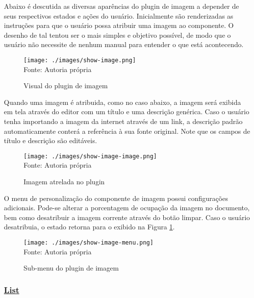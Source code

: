 
Abaixo é descutida as diversas aparências do plugin de imagem
a depender de seus respectivos estados e ações do usuário.
Inicialmente são renderizadas as instruções para que o usuário possa
atribuir uma imagem ao componente. O desenho de tal tentou ser o mais
simples e objetivo possível, de modo que o usuário não necessite de
nenhum manual para entender o que está acontecendo.

\begin{figure}[H]
    \centering
    \caption{Visual do plugin de imagem}
    \texttt{[image: ./images/show-image.png]}
    \label{fig:show-image} \\
    \textnormal{\fontsize{10pt}{12pt}Fonte: Autoria própria}
\end{figure}

Quando uma imagem é atribuida, como no caso abaixo, a imagem será exibida
em tela através do editor com um título e uma descrição genérica.
Caso o usuário tenha importando a imagem da internet através de um link, a
descrição padrão automaticamente conterá a referência à sua fonte original.
Note que os campos de título e descrição são editáveis.

\begin{figure}[H]
    \centering
    \caption{Imagem atrelada no plugin}
    \texttt{[image: ./images/show-image-image.png]}
    \label{fig:show-image-image} \\
    \textnormal{\fontsize{10pt}{12pt}Fonte: Autoria própria}
\end{figure}

O menu de personalização do componente de imagem possui configurações
adicionais. Pode-se alterar a porcentagem de ocupação da imagem no documento,
bem como desatribuir a imagem corrente através do botão limpar. Caso o usuário
desatribuia, o estado retorna para o exibido na
Figura \ref{fig:show-image}.

\begin{figure}[H]
    \centering
    \caption{Sub-menu do plugin de imagem}
    \texttt{[image: ./images/show-image-menu.png]}
    \label{fig:show-image-menu} \\
    \textnormal{\fontsize{10pt}{12pt}Fonte: Autoria própria}
\end{figure}

\subsubsection{\underline{List}}

